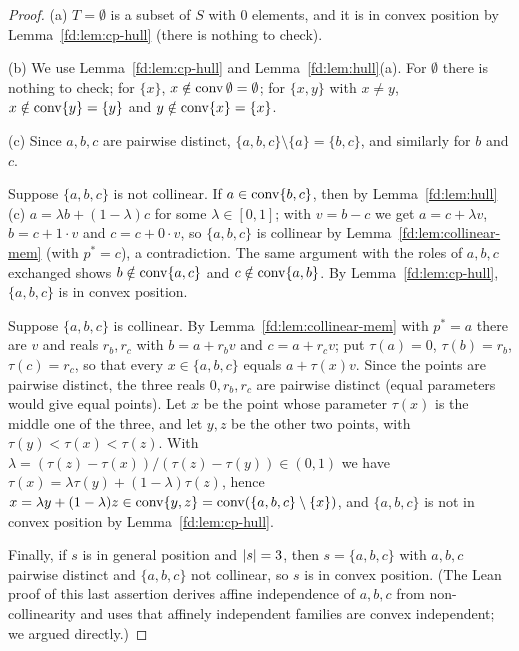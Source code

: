 \begin{proof}
(a) $T=\emptyset$ is a subset of $S$ with $0$ elements, and it is in convex position by
Lemma~\ref{fd:lem:cp-hull} (there is nothing to check).

(b) We use Lemma~\ref{fd:lem:cp-hull} and Lemma~\ref{fd:lem:hull}(a). For $\emptyset$ there is nothing to
check; for $\{x\}$, $x\notin\operatorname{conv}\emptyset=\emptyset$; for $\{x,y\}$ with $x\ne y$,
$x\notin\operatorname{conv}\{y\}=\{y\}$ and $y\notin\operatorname{conv}\{x\}=\{x\}$.

(c) Since $a,b,c$ are pairwise distinct, $\{a,b,c\}\setminus\{a\}=\{b,c\}$, and similarly for $b$ and
$c$.

Suppose $\{a,b,c\}$ is not collinear. If $a\in\operatorname{conv}\{b,c\}$, then by Lemma~\ref{fd:lem:hull}(c)
$a=\lambda b+(1-\lambda)c$ for some $\lambda\in[0,1]$; with $v=b-c$ we get $a=c+\lambda v$, $b=c+1\cdot v$
and $c=c+0\cdot v$, so $\{a,b,c\}$ is collinear by Lemma~\ref{fd:lem:collinear-mem} (with $p^*=c$), a
contradiction. The same argument with the roles of $a,b,c$ exchanged shows $b\notin\operatorname{conv}\{a,c\}$ and
$c\notin\operatorname{conv}\{a,b\}$. By Lemma~\ref{fd:lem:cp-hull}, $\{a,b,c\}$ is in convex position.

Suppose $\{a,b,c\}$ is collinear. By Lemma~\ref{fd:lem:collinear-mem} with $p^*=a$ there are $v$ and
reals $r_b,r_c$ with $b=a+r_bv$ and $c=a+r_cv$; put $\tau(a)=0$, $\tau(b)=r_b$, $\tau(c)=r_c$, so that
every $x\in\{a,b,c\}$ equals $a+\tau(x)v$. Since the points are pairwise distinct, the three reals
$0,r_b,r_c$ are pairwise distinct (equal parameters would give equal points). Let $x$ be the point whose
parameter $\tau(x)$ is the middle one of the three, and let
$y,z$ be the other two points, with $\tau(y)<\tau(x)<\tau(z)$. With
$\lambda=(\tau(z)-\tau(x))/(\tau(z)-\tau(y))\in(0,1)$ we have
$\tau(x)=\lambda\tau(y)+(1-\lambda)\tau(z)$, hence $x=\lambda y+(1-\lambda)z\in\operatorname{conv}\{y,z\}
=\operatorname{conv}(\{a,b,c\}\setminus\{x\})$, and $\{a,b,c\}$ is not in convex position by
Lemma~\ref{fd:lem:cp-hull}.

Finally, if $s$ is in general position and $\lvert s\rvert=3$, then $s=\{a,b,c\}$ with $a,b,c$ pairwise distinct
and $\{a,b,c\}$ not collinear, so $s$ is in convex position. (The Lean proof of this last assertion
derives affine independence of $a,b,c$ from non-collinearity and uses that affinely independent families
are convex independent; we argued directly.)
\end{proof}

